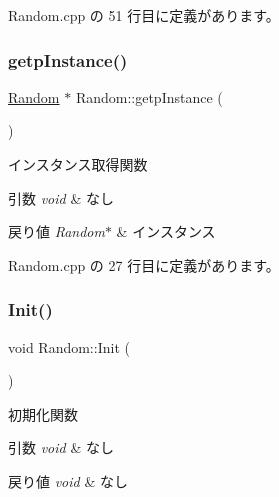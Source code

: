  Random.\+cpp の 51 行目に定義があります。

\mbox{\label{class_random_a96dbaee553997a71a331fb0b335aa72d}} 
\subsubsection{\texorpdfstring{getp\+Instance()}{getpInstance()}}
{\footnotesize\ttfamily \mbox{\hyperlink{class_random}{Random}} $\ast$ Random\+::getp\+Instance (\begin{DoxyParamCaption}{ }\end{DoxyParamCaption})\hspace{0.3cm}{\ttfamily [static]}}



インスタンス取得関数 


\begin{DoxyParams}{引数}
{\em void} & なし \\
\hline
\end{DoxyParams}

\begin{DoxyRetVals}{戻り値}
{\em Random$\ast$} & インスタンス \\
\hline
\end{DoxyRetVals}


 Random.\+cpp の 27 行目に定義があります。

\mbox{\label{class_random_a9feade8fc8026ed3e7aad3b1cdd9b55a}} 
\subsubsection{\texorpdfstring{Init()}{Init()}}
{\footnotesize\ttfamily void Random\+::\+Init (\begin{DoxyParamCaption}{ }\end{DoxyParamCaption})}



初期化関数 


\begin{DoxyParams}{引数}
{\em void} & なし \\
\hline
\end{DoxyParams}

\begin{DoxyRetVals}{戻り値}
{\em void} & なし \\
\hline
\end{DoxyRetVals}


